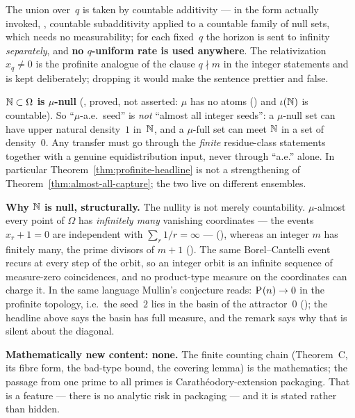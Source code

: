 \noindent The union over~$q$ is taken by countable additivity --- in the
form actually invoked, , countable
subadditivity applied to a countable family of null sets, which needs no
measurability; for each fixed~$q$ the horizon is sent to
infinity \emph{separately}, and \textbf{no $q$-uniform rate is used
anywhere}.  The relativization $x_q \neq 0$ is the profinite analogue of
the clause $q \nmid m$ in the integer statements and is kept deliberately;
dropping it would make the sentence prettier and false.

\begin{remark}
\textbf{$\mathbb{N} \subset \Omega$ is $\mu$-null}
(,
proved, not asserted: $\mu$ has no atoms
()
and $\iota(\mathbb{N})$ is countable).  So ``$\mu$-a.e.\ seed'' is \emph{not}
``almost all integer seeds'': a $\mu$-null set can have upper natural
density~$1$ in~$\mathbb{N}$, and a $\mu$-full set can meet $\mathbb{N}$ in a set of
density~$0$.  Any transfer must go through the \emph{finite} residue-class
statements together with a genuine equidistribution input, never through
``a.e.'' alone.  In particular Theorem~\ref{thm:profinite-headline} is not
a strengthening of Theorem~\ref{thm:almost-all-capture}; the two live on
different ensembles.

\smallskip
\textbf{Why $\mathbb{N}$ is null, structurally.}  The nullity is not merely
countability.  $\mu$-almost every point of $\Omega$ has \emph{infinitely
many} vanishing coordinates --- the events $x_r+1=0$ are independent with
$\sum_r 1/r=\infty$ ---
(),
whereas an integer $m$ has finitely many, the prime divisors of $m+1$
().
The same Borel--Cantelli event recurs at every step of the orbit, so an
integer orbit is an infinite sequence of measure-zero coincidences, and no
product-type measure on the coordinates can charge it.  In the same
language Mullin's conjecture reads: $\mathrm{P}_{}(n)\to 0$ in the profinite
topology, i.e.\ the seed~$2$ lies in the basin of the attractor~$0$
();
the headline above says the basin has full measure, and the remark says why
that is silent about the diagonal.

\smallskip
\textbf{Mathematically new content: none.}  The finite counting chain
(Theorem~C, its fibre form, the bad-type bound, the covering lemma) is the
mathematics; the passage from one prime to all primes is
Carath\'eodory-extension packaging.  That is a feature --- there is no
analytic risk in packaging --- and it is stated rather than hidden.


\end{remark}
